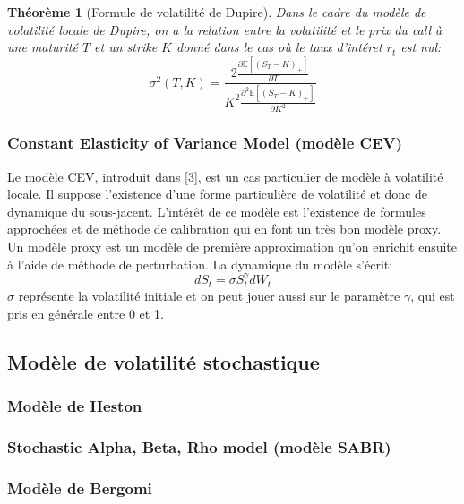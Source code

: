 \documentclass[a4paper]{article}
\newtheorem{theorem}{Théorème}[section]
\begin{document}
\begin{theorem}[Formule de volatilité de Dupire]
Dans le cadre du modèle de volatilité locale de Dupire, on a la relation entre la volatilité et le prix du call à une maturité $T$ et un strike $K$ donné dans le cas où le taux d'intéret $r_t$ est nul:
\begin{equation}
    \sigma ^2(T,K) = \frac{2 \frac{\partial \mathbb{E}[(S_T - K)_+]}{\partial T}}{K^2 \frac{\partial^2 \mathbb{E}[(S_T - K)_+]}{\partial K^2}}
\end{equation}
\end{theorem}
\subsubsection{Constant Elasticity of Variance Model (modèle CEV)}
Le modèle CEV, introduit dans [3], est un cas particulier de modèle à
volatilité locale. Il suppose l'existence d'une forme particulière de volatilité et donc de dynamique du sous-jacent. L'intérêt de ce modèle est l'existence de formules approchées et de méthode de calibration qui en font un très bon modèle proxy. Un modèle proxy est un modèle de première approximation qu'on enrichit ensuite à l'aide de méthode de perturbation.
La dynamique du modèle s'écrit:
\begin{equation}
    dS_t = \sigma S_t ^{\gamma} dW_t
\end{equation}
$\sigma$ représente la volatilité initiale et on peut jouer aussi sur le paramètre $\gamma$, qui est pris en générale entre 0 et 1.
\subsection{Modèle de volatilité stochastique}

\subsubsection{Modèle de Heston}

\subsubsection{Stochastic Alpha, Beta, Rho model (modèle SABR)}

\subsubsection{Modèle de Bergomi}
\end{document}
